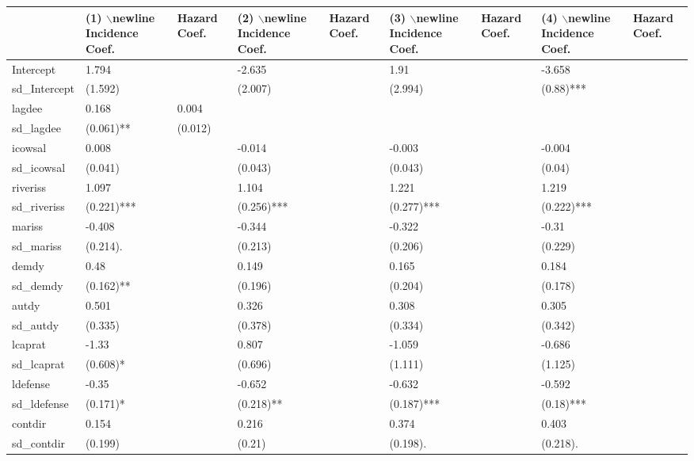 \begin{table}[ht]
\centering
\begin{tabular}{lllllllll}
  \hline
  & (1) $\backslash$newline Incidence Coef. &  Hazard Coef. & (2) $\backslash$newline Incidence Coef. &  Hazard Coef. & (3) $\backslash$newline Incidence Coef. &  Hazard Coef. & (4) $\backslash$newline Incidence Coef. &  Hazard Coef. \\ 
  \hline
Intercept & 1.794 &  & -2.635 &  & 1.91 &  & -3.658 &  \\ 
  sd\_Intercept & (1.592)  &  & (2.007)  &  & (2.994)  &  & (0.88)*** &  \\ 
  lagdee & 0.168 & 0.004 &  &  &  &  &  &  \\ 
  sd\_lagdee & (0.061)** & (0.012)  &  &  &  &  &  &  \\ 
  icowsal & 0.008 &  & -0.014 &  & -0.003 &  & -0.004 &  \\ 
  sd\_icowsal & (0.041)  &  & (0.043)  &  & (0.043)  &  & (0.04)  &  \\ 
  riveriss & 1.097 &  & 1.104 &  & 1.221 &  & 1.219 &  \\ 
  sd\_riveriss & (0.221)*** &  & (0.256)*** &  & (0.277)*** &  & (0.222)*** &  \\ 
  mariss & -0.408 &  & -0.344 &  & -0.322 &  & -0.31 &  \\ 
  sd\_mariss & (0.214). &  & (0.213)  &  & (0.206)  &  & (0.229)  &  \\ 
  demdy & 0.48 &  & 0.149 &  & 0.165 &  & 0.184 &  \\ 
  sd\_demdy & (0.162)** &  & (0.196)  &  & (0.204)  &  & (0.178)  &  \\ 
  autdy & 0.501 &  & 0.326 &  & 0.308 &  & 0.305 &  \\ 
  sd\_autdy & (0.335)  &  & (0.378)  &  & (0.334)  &  & (0.342)  &  \\ 
  lcaprat & -1.33 &  & 0.807 &  & -1.059 &  & -0.686 &  \\ 
  sd\_lcaprat & (0.608)* &  & (0.696)  &  & (1.111)  &  & (1.125)  &  \\ 
  ldefense & -0.35 &  & -0.652 &  & -0.632 &  & -0.592 &  \\ 
  sd\_ldefense & (0.171)* &  & (0.218)** &  & (0.187)*** &  & (0.18)*** &  \\ 
  contdir & 0.154 &  & 0.216 &  & 0.374 &  & 0.403 &  \\ 
  sd\_contdir & (0.199)  &  & (0.21)  &  & (0.198). &  & (0.218). &  \\ 

\end{tabular}
\end{table}
